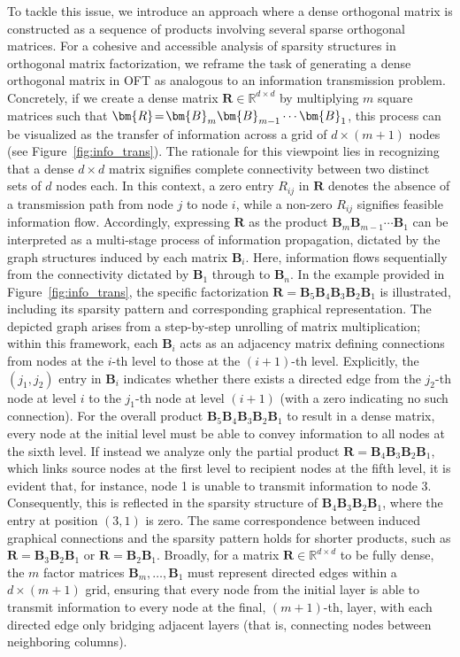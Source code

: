 To tackle this issue, we introduce an approach where a dense orthogonal matrix is constructed as a sequence of products involving several sparse orthogonal matrices. For a cohesive and accessible analysis of sparsity structures in orthogonal matrix factorization, we reframe the task of generating a dense orthogonal matrix in OFT as analogous to an information transmission problem. Concretely, if we create a dense matrix $\bm{R}\in\mathbb{R}^{d\times d}$ by multiplying $m$ square matrices such that $\thickmuskip=2mu \medmuskip=2mu \bm{R}=\bm{B}_m\bm{B}_{m-1}\cdots\bm{B}_1$, this process can be visualized as the transfer of information across a grid of $d\times (m+1)$ nodes (see Figure~\ref{fig:info_trans}). The rationale for this viewpoint lies in recognizing that a dense $d\times d$ matrix signifies complete connectivity between two distinct sets of $d$ nodes each. In this context, a zero entry $R_{ij}$ in $\bm{R}$ denotes the absence of a transmission path from node $j$ to node $i$, while a non-zero $R_{ij}$ signifies feasible information flow. Accordingly, expressing $\bm{R}$ as the product $\bm{B}_m\bm{B}_{m-1}\cdots\bm{B}_1$ can be interpreted as a multi-stage process of information propagation, dictated by the graph structures induced by each matrix $\bm{B}_i$. Here, information flows sequentially from the connectivity dictated by $\bm{B}_1$ through to $\bm{B}_n$. In the example provided in Figure~\ref{fig:info_trans}, the specific factorization $\bm{R}=\bm{B}_5\bm{B}_4\bm{B}_3\bm{B}_2\bm{B}_1$ is illustrated, including its sparsity pattern and corresponding graphical representation. The depicted graph arises from a step-by-step unrolling of matrix multiplication; within this framework, each $\bm{B}_i$ acts as an adjacency matrix defining connections from nodes at the $i$-th level to those at the $(i+1)$-th level. Explicitly, the $(j_1,j_2)$ entry in $\bm{B}_i$ indicates whether there exists a directed edge from the $j_2$-th node at level $i$ to the $j_1$-th node at level $(i+1)$ (with a zero indicating no such connection). For the overall product $\bm{B}_5\bm{B}_4\bm{B}_3\bm{B}_2\bm{B}_1$ to result in a dense matrix, every node at the initial level must be able to convey information to all nodes at the sixth level. If instead we analyze only the partial product $\bm{R}=\bm{B}_4\bm{B}_3\bm{B}_2\bm{B}_1$, which links source nodes at the first level to recipient nodes at the fifth level, it is evident that, for instance, node 1 is unable to transmit information to node 3. Consequently, this is reflected in the sparsity structure of $\bm{B}_4\bm{B}_3\bm{B}_2\bm{B}_1$, where the entry at position $(3,1)$ is zero. The same correspondence between induced graphical connections and the sparsity pattern holds for shorter products, such as $\bm{R}=\bm{B}_3\bm{B}_2\bm{B}_1$ or $\bm{R}=\bm{B}_2\bm{B}_1$. Broadly, for a matrix $\bm{R}\in\mathbb{R}^{d\times d}$ to be fully dense, the $m$ factor matrices $\bm{B}_m,\ldots,\bm{B}_1$ must represent directed edges within a $d\times (m+1)$ grid, ensuring that every node from the initial layer is able to transmit information to every node at the final, $(m+1)$-th, layer, with each directed edge only bridging adjacent layers (that is, connecting nodes between neighboring columns).

